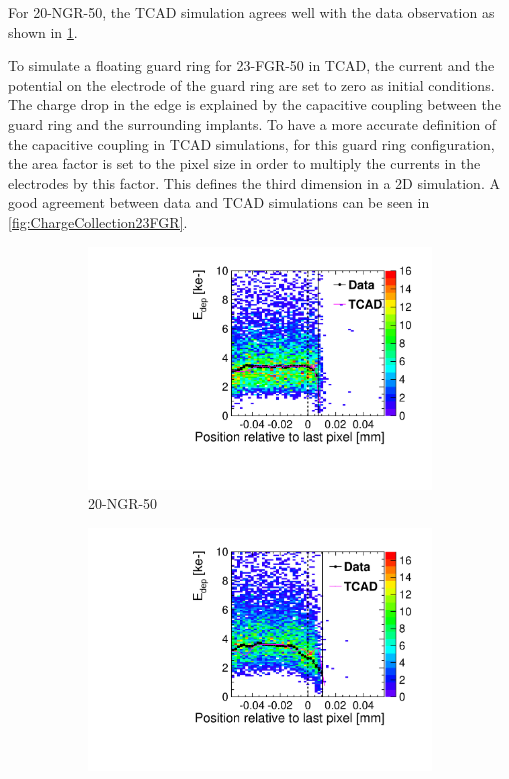 For 20-NGR-50, the TCAD simulation agrees well with the data
observation as shown in \cref{fig:ChargeCollection20NGR}.

To simulate a floating guard ring for 23-FGR-50 in TCAD, the current
and the potential on the electrode of the guard ring are set to zero
as initial conditions. The charge drop in the edge is explained by the
capacitive coupling between the guard ring and the surrounding
implants. To have a more accurate definition of the capacitive
coupling in TCAD simulations, for this guard ring configuration, the
area factor is set to the pixel size in order to multiply the currents
in the electrodes by this factor. This defines the third dimension in
a 2D simulation. A good agreement between data and TCAD simulations
can be seen in \cref{fig:ChargeCollection23FGR}.

\begin{figure}[htbp]
  \begin{subfigure}[b]{0.45\textwidth}
    \centering
    \includegraphics[width=\textwidth]{figures/ActiveEdge/20_NGR_Edep_TCAD_data.pdf}
    \caption{20-NGR-50}\label{fig:ChargeCollection20NGR}
  \end{subfigure}\hfill
  \begin{subfigure}[b]{0.45\textwidth}
    \centering
    \includegraphics[width=\textwidth]{figures/ActiveEdge/23_FGR_Edep_TCAD_data.pdf}

\end{subfigure}
\end{figure}

